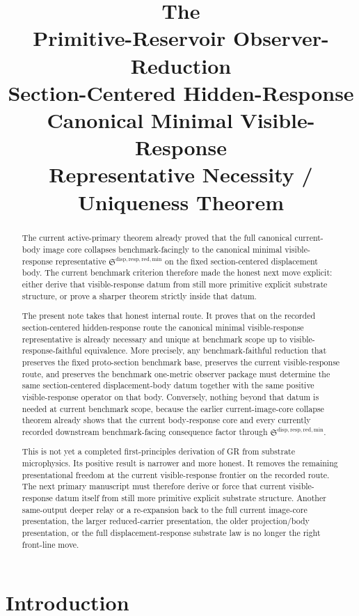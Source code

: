 \documentclass[11pt]{article}
\title{\textbf{The \TheoryName{}}\\[0.4em]
\large Primitive-Reservoir Observer-Reduction\\
\large Section-Centered Hidden-Response\\
\large Canonical Minimal Visible-Response\\
\large Representative Necessity / Uniqueness Theorem}
\author{}
\date{}
\newcommand{\MinimalReducedStructure}{\mathfrak S^{\mathrm{disp,resp,red,min}}}
\begin{document}
\maketitle

\begin{abstract}
The current active-primary theorem already proved that the full canonical current-body image core collapses benchmark-facingly to the canonical minimal visible-response representative \(\MinimalReducedStructure\) on the fixed section-centered displacement body. The current benchmark criterion therefore made the honest next move explicit: either derive that visible-response datum from still more primitive explicit substrate structure, or prove a sharper theorem strictly inside that datum.

The present note takes that honest internal route. It proves that on the recorded section-centered hidden-response route the canonical minimal visible-response representative is already necessary and unique at benchmark scope up to visible-response-faithful equivalence. More precisely, any benchmark-faithful reduction that preserves the fixed proto-section benchmark base, preserves the current visible-response route, and preserves the benchmark one-metric observer package must determine the same section-centered displacement-body datum together with the same positive visible-response operator on that body. Conversely, nothing beyond that datum is needed at current benchmark scope, because the earlier current-image-core collapse theorem already shows that the current body-response core and every currently recorded downstream benchmark-facing consequence factor through \(\MinimalReducedStructure\).

This is not yet a completed first-principles derivation of GR from substrate microphysics. Its positive result is narrower and more honest. It removes the remaining presentational freedom at the current visible-response frontier on the recorded route. The next primary manuscript must therefore derive or force that current visible-response datum itself from still more primitive explicit substrate structure. Another same-output deeper relay or a re-expansion back to the full current image-core presentation, the larger reduced-carrier presentation, the older projection/body presentation, or the full displacement-response substrate law is no longer the right front-line move.
\end{abstract}

\section{Introduction}
\end{document}
